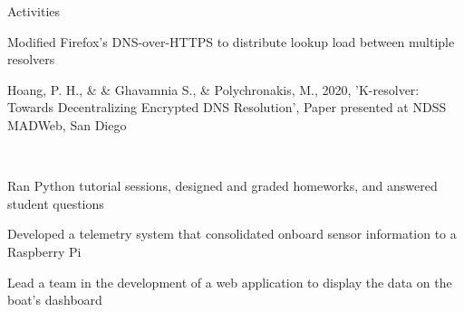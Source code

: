 \documentclass[]{deedy-resume-openfont}
\begin{document}
%
%
\begin{resumesection}{Activities}
\newline
{}\hfill{}
\vspace{-5pt}
\begin{tightemize}
    \item Modified Firefox's DNS-over-HTTPS to distribute lookup load between multiple resolvers
    \item Hoang, P. H., \&  \& Ghavamnia S., \& Polychronakis, M., 2020, 'K-resolver: Towards Decentralizing Encrypted DNS Resolution', Paper presented at NDSS MADWeb, San Diego
    \iffalse
    \item Tested and compared the results of semisupervised generative adversarial networks to traditional GANs and discriminator convolutional neural nets
    \fi
\end{tightemize}
\vspace{5pt}
\hfill{}\\
\vspace{-5pt}
\begin{tightemize}
    \item Ran Python tutorial sessions, designed and graded homeworks, and answered student questions
\end{tightemize}
\vspace{4pt}
\iffalse
\descript{Teaching Assistant: Introduction to Stony Brook}\hfill\location{July 2017 - December 2017}
\sectionsep
\vspace{-5pt}\\
\fi
{}\newline
\iffalse
\descript{Vice President}\hfill\location{September 2018 - Present}
\vspace{-5pt}
\begin{tightemize}
    \item Scheduled meetings, met with advisors and funding sources, and supervised general body members
\end{tightemize}
\fi
{}
\vspace{-5pt}
\begin{tightemize}
    \item Developed a telemetry system that consolidated onboard sensor information to a Raspberry Pi
    \item Lead a team in the development of a web application to display the data on the boat's dashboard
\end{tightemize}
\end{resumesection}
\end{document}
